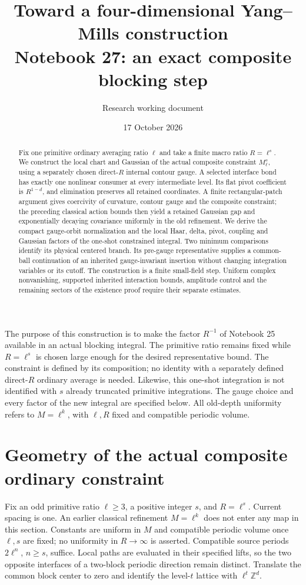 \documentclass[11pt]{article}
\title{Toward a four-dimensional Yang--Mills construction\\
\large Notebook 27: an exact composite blocking step}
\author{Research working document}
\date{17 October 2026}
\theoremstyle{remark}
\begin{document}
\maketitle
\begin{abstract}
Fix one primitive ordinary averaging ratio $\ell$ and take a finite
macro ratio $R=\ell^s$. We construct the local chart and Gaussian
of the actual composite constraint $M_\ell^s$, using a separately
chosen direct-$R$ internal contour gauge. A selected interface bond
has exactly one nonlinear consumer at every intermediate level.
Its flat pivot coefficient is $R^{1-d}$, and elimination preserves
all retained coordinates. A finite rectangular-patch argument gives
coercivity of curvature, contour gauge and the composite constraint;
the preceding classical action bounds then yield a retained Gaussian
gap and exponentially decaying covariance uniformly in the old
refinement. We derive the compact gauge-orbit normalization and the
local Haar, delta, pivot, coupling and Gaussian factors of the
one-shot constrained integral. Two minimum comparisons identify its
physical centered branch. Its pre-gauge representative supplies a
common-ball continuation of an inherited gauge-invariant insertion
without changing integration variables or its cutoff.
The construction is a finite small-field step. Uniform complex
nonvanishing, supported inherited interaction bounds, amplitude
control and the remaining sectors of the existence proof require
their separate estimates.
\end{abstract}

The purpose of this construction is to make the factor $R^{-1}$ of
Notebook 25 available in an actual blocking integral. The primitive
ratio remains fixed while $R=\ell^s$ is chosen large enough for the
desired representative bound. The constraint is defined by its
composition; no identity with a separately defined direct-$R$
ordinary average is needed. Likewise, this one-shot integration is
not identified with $s$ already truncated primitive integrations.
The gauge choice and every factor of the new integral are specified
below. All old-depth uniformity refers to $M=\ell^k$, with $\ell,R$
fixed and compatible periodic volume.


\section{Geometry of the actual composite ordinary constraint}
\label{cmg-section}

Fix an odd primitive ratio $\ell\ge3$, a positive integer $s$, and
$R=\ell^s$. Current spacing is one. An earlier classical refinement
$M=\ell^k$ does not enter any map in this section. Constants are uniform
in $M$ and compatible periodic volume once $\ell,s$ are fixed; no
uniformity in $R\to\infty$ is asserted. Compatible source periods
$2\ell^n$, $n\ge s$, suffice. Local paths are evaluated in their specified
lifts, so the two opposite interfaces of a two-block periodic direction
remain distinct. Translate the common block center to zero and identify
the level-$t$ lattice with $\ell^t\mathbb Z^d$.
\end{document}
